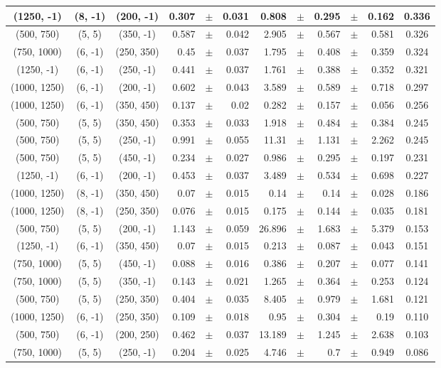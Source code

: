 \documentclass[12pt]{paper}
\begin{document}
\begin{table}[ht]
\begin{center}
{\begin{tabular}{|c|c|c|rrr|rrrrr|c|}
(1250, -1)&(8, -1)&(200, -1)&0.307&$\pm$&0.031&0.808&$\pm$&0.295&$\pm$&0.162&0.336\\\hline
(500, 750)&(5, 5)&(350, -1)&0.587&$\pm$&0.042&2.905&$\pm$&0.567&$\pm$&0.581&0.326\\\hline
(750, 1000)&(6, -1)&(250, 350)&0.45&$\pm$&0.037&1.795&$\pm$&0.408&$\pm$&0.359&0.324\\\hline
(1250, -1)&(6, -1)&(250, -1)&0.441&$\pm$&0.037&1.761&$\pm$&0.388&$\pm$&0.352&0.321\\\hline
(1000, 1250)&(6, -1)&(200, -1)&0.602&$\pm$&0.043&3.589&$\pm$&0.589&$\pm$&0.718&0.297\\\hline
(1000, 1250)&(6, -1)&(350, 450)&0.137&$\pm$&0.02&0.282&$\pm$&0.157&$\pm$&0.056&0.256\\\hline
(500, 750)&(5, 5)&(350, 450)&0.353&$\pm$&0.033&1.918&$\pm$&0.484&$\pm$&0.384&0.245\\\hline
(500, 750)&(5, 5)&(250, -1)&0.991&$\pm$&0.055&11.31&$\pm$&1.131&$\pm$&2.262&0.245\\\hline
(500, 750)&(5, 5)&(450, -1)&0.234&$\pm$&0.027&0.986&$\pm$&0.295&$\pm$&0.197&0.231\\\hline
(1250, -1)&(6, -1)&(200, -1)&0.453&$\pm$&0.037&3.489&$\pm$&0.534&$\pm$&0.698&0.227\\\hline
(1000, 1250)&(8, -1)&(350, 450)&0.07&$\pm$&0.015&0.14&$\pm$&0.14&$\pm$&0.028&0.186\\\hline
(1000, 1250)&(8, -1)&(250, 350)&0.076&$\pm$&0.015&0.175&$\pm$&0.144&$\pm$&0.035&0.181\\\hline
(500, 750)&(5, 5)&(200, -1)&1.143&$\pm$&0.059&26.896&$\pm$&1.683&$\pm$&5.379&0.153\\\hline
(1250, -1)&(6, -1)&(350, 450)&0.07&$\pm$&0.015&0.213&$\pm$&0.087&$\pm$&0.043&0.151\\\hline
(750, 1000)&(5, 5)&(450, -1)&0.088&$\pm$&0.016&0.386&$\pm$&0.207&$\pm$&0.077&0.141\\\hline
(750, 1000)&(5, 5)&(350, -1)&0.143&$\pm$&0.021&1.265&$\pm$&0.364&$\pm$&0.253&0.124\\\hline
(500, 750)&(5, 5)&(250, 350)&0.404&$\pm$&0.035&8.405&$\pm$&0.979&$\pm$&1.681&0.121\\\hline
(1000, 1250)&(6, -1)&(250, 350)&0.109&$\pm$&0.018&0.95&$\pm$&0.304&$\pm$&0.19&0.110\\\hline
(500, 750)&(6, -1)&(200, 250)&0.462&$\pm$&0.037&13.189&$\pm$&1.245&$\pm$&2.638&0.103\\\hline
(750, 1000)&(5, 5)&(250, -1)&0.204&$\pm$&0.025&4.746&$\pm$&0.7&$\pm$&0.949&0.086\\\hline

\end{tabular}}
\end{center}
\end{table}
\end{document}
